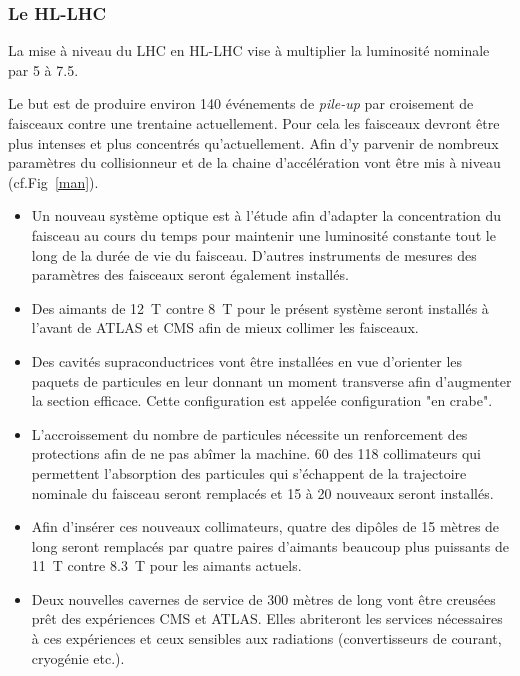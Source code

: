 \subsubsection{Le HL-LHC}
La mise à niveau du LHC en HL-LHC vise à multiplier la luminosité nominale par \num{5} à \num{7.5}.

Le but est de produire environ \num{140} événements de \textit{pile-up} par croisement de faisceaux contre une trentaine actuellement. Pour cela les faisceaux devront être plus intenses et plus concentrés qu'actuellement. Afin d'y parvenir de nombreux paramètres du collisionneur et de la chaine d'accélération vont être mis à niveau (cf.Fig~\ref{man}).

\begin{itemize}[label=$\bullet$]
	
 \item Un nouveau système optique est à l'étude afin d'adapter la concentration du faisceau au cours du temps pour maintenir une luminosité constante tout le long de la durée de vie du faisceau. D'autres instruments de mesures des paramètres des faisceaux seront également installés.
 
 \item Des aimants de \SI{12}{\tesla} contre \SI{8}{\tesla} pour le présent système seront installés à l'avant de ATLAS et CMS afin de mieux collimer les faisceaux.
 
 \item Des cavités supraconductrices vont être installées en vue d'orienter les paquets de particules en leur donnant un moment transverse afin d'augmenter la section efficace. Cette configuration est appelée configuration "en crabe".
 
 \item L'accroissement du nombre de particules nécessite un renforcement des protections afin de ne pas abîmer la machine. \num{60} des \num{118} collimateurs qui permettent l'absorption des particules qui s'échappent de la trajectoire nominale du faisceau seront remplacés et \num{15} à \num{20} nouveaux seront installés.
 
 \item Afin d'insérer ces nouveaux collimateurs, quatre des dipôles de \num{15} mètres de long seront remplacés par quatre paires d'aimants beaucoup plus puissants de \SI{11}{\tesla} contre \SI{8.3}{\tesla} pour les aimants actuels.
 
 \item Deux nouvelles cavernes de service de \num{300} mètres de long vont être creusées prêt des expériences CMS et ATLAS. Elles abriteront les services nécessaires à ces expériences et ceux sensibles aux radiations (convertisseurs de courant, cryogénie etc.).
 

\end{itemize}
